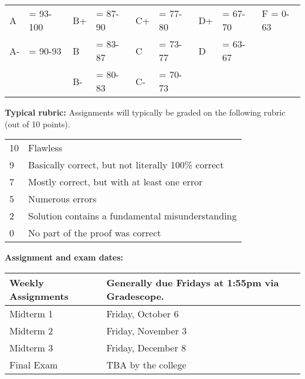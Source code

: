 \documentclass[12pt]{article}
\begin{document}
\begin{center}
 \begin{tabular}{|ll|ll|ll|ll|l|}
\hline
A &\hspace{-3 pt}\hspace{-7 pt}= 93-100 &B+ &\hspace{-7 pt}= 87-90 &C+ &\hspace{-7 pt}= 77-80 & D+ &\hspace{-7 pt}= 67-70 & F = 0-63\\
A- &\hspace{-3 pt}\hspace{-7 pt}= 90-93 &B &\hspace{-7 pt}= 83-87 & C &\hspace{-7 pt}= 73-77 & D &\hspace{-7 pt}= 63-67 &\\
 & &B- &\hspace{-7 pt}= 80-83 &C- &\hspace{-7 pt}= 70-73 & & &\\
 \hline
 \end{tabular}
\end{center}

\newpage
\vspace*{.15in}
\noindent\textbf{Typical rubric:}
Assignments will typically be graded on the following rubric (out of 10 points).

\begin{center}
 \begin{tabular}{|l|l|}
 \hline
 10& Flawless\\
 9& Basically correct, but not literally 100\% correct\\
 7& Mostly correct, but with at least one error\\
 5& Numerous errors\\
 2& Solution contains a fundamental misunderstanding\\
 0& No part of the proof was correct\\
 \hline
 \end{tabular}
\end{center}

\noindent\textbf{Assignment and exam dates:}

\begin{center}
 \begin{tabular}{|l|l|}
 \hline
 Weekly Assignments & Generally due Fridays at 1:55pm via Gradescope.\\
 \hline
 Midterm 1 & Friday, October 6 \\
 Midterm 2 & Friday, November 3 \\
 Midterm 3 & Friday, December 8 \\ 
 Final Exam & TBA by the college	 \\
 \hline
 \end{tabular}
\end{center}
\end{document}
